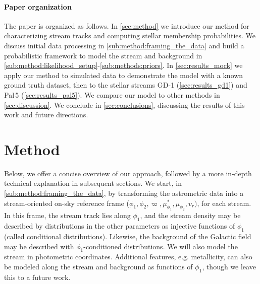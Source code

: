 \documentclass[twocolumn]{aastex631}
\newcommand{\stream}[1]{#1}
\newcommand{\parallax}{\varpi}
\begin{document}
    \paragraph{Paper organization}

        The paper is organized as follows.  In \autoref{sec:method} we introduce
        our method for characterizing stream tracks and computing stellar
        membership probabilities.  We discuss initial data processing in
        \autoref{sub:method:framing_the_data} and build a probabilistic
        framework to model the stream and background in
        \autoref{sub:method:likelihood_setup}-\autoref{sub:methods:priors}.  In
        \autoref{sec:results_mock} we apply our method to simulated data to
        demonstrate the model with a known ground truth dataset, then to the
        stellar streams \stream{GD-1} (\autoref{sec:results_gd1}) and
        \stream{Pal\,5} (\autoref{sec:results_pal5}).  We compare our model to
        other methods in \autoref{sec:discussion}.  We conclude in
        \autoref{sec:conclusions}, discussing the results of this work and
        future directions.


\newpage
\section{Method} \label{sec:method}

    Below, we offer a concise overview of our approach, followed by a more
    in-depth technical explanation in subsequent sections.  We start, in
    \autoref{sub:method:framing_the_data}, by transforming the astrometric data
    into a stream-oriented on-sky reference frame ($\phi_1, \phi_2, \parallax,
    \mu_{\phi_1}^*, \mu_{\phi_2}, v_r)$, for each stream.  In this frame, the
    stream track lies along $\phi_1$, and the stream density may be described by
    distributions in the other parameters as injective functions of $\phi_1$
    (called conditional distributions).  Likewise, the background of the
    Galactic field may be described with $\phi_1$-conditioned distributions.  We
    will also model the stream in photometric coordinates.  Additional features,
    e.g.  metallicity, can also be modeled along the stream and background as
    functions of $\phi_1$, though we leave this to a future work.
\end{document}
